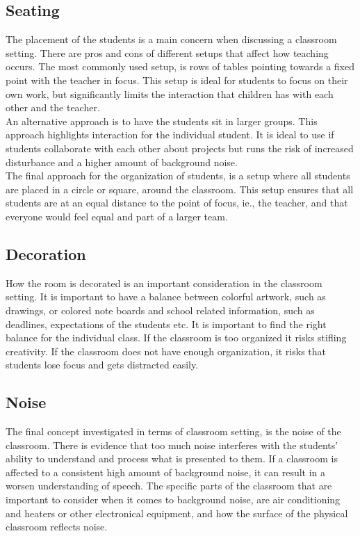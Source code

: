 \subsection{Seating}
The placement of the students is a main concern when discussing a classroom setting. There are pros and cons of different setups that affect how teaching occurs.
The most commonly used setup, is rows of tables pointing towards a fixed point with the teacher in focus. This setup is ideal for students to focus on their own work, but significantly limits the interaction that children has with each other and the teacher.\cite{classroomsetting} \\

An alternative approach is to have the students sit in larger groups. This approach highlights interaction for the individual student. It is ideal to use if students collaborate with each other about projects but runs the risk of increased disturbance and a higher amount of background noise.\cite{classroomsetting}\\

The final approach for the organization of students, is a setup where all students are placed in a circle or square, around the classroom. This setup ensures that all students are at an equal distance to the point of focus, ie., the teacher, and that everyone would feel equal and part of a larger team.\cite{classroomsetting}\\

\subsection{Decoration}
How the room is decorated is an important consideration in the classroom setting. It is important to have a balance between colorful artwork, such as drawings, or colored note boards and school related information, such as deadlines, expectations of the students etc.\cite{classroomsetting} It is important to find the right balance for the individual class. If the classroom is too organized it risks stifling creativity. If the classroom does not have enough organization, it risks that students lose focus and gets distracted easily.\cite{classroomsetting}\\

\subsection{Noise}
The final concept investigated in terms of classroom setting, is the noise of the classroom. There is evidence that too much noise interferes with the students’ ability to understand and process what is presented to them.\cite{classroomnoise} If a classroom is affected to a consistent high amount of background noise, it can result in a worsen understanding of speech.\cite{classroomnoise} The specific parts of the classroom that are important to consider when it comes to background noise, are air conditioning and heaters or other electronical equipment, and how the surface of the physical classroom reflects noise.\cite{classroomnoise}\\



